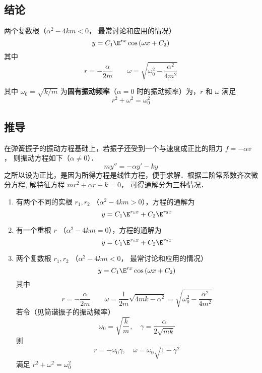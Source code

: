 \subsection{结论}
两个复数根（${\alpha ^2} - 4km < 0$， 最常讨论和应用的情况）
\begin{equation}
y = {C_1}{\E^{rx}}\cos \left( {\omega x + {C_2}} \right)
\end{equation}
其中
\begin{equation}
r =  - \frac{\alpha }{{2m}} \qquad  \omega  = \sqrt {\omega _0^2 - \frac{{{\alpha ^2}}}{{4{m^2}}}}
\end{equation}

其中 ${\omega _0} = \sqrt {{k}/{m}}$ 为\textbf{固有振动频率}（$\alpha  = 0$ 时的振动频率）为，$r$ 和 $\omega$ 满足
\begin{equation}
{r^2} + {\omega ^2} = \omega _0^2
\end{equation}

\subsection{推导}
在弹簧振子的振动方程基础上，若振子还受到一个与速度成正比的阻力 $f =  - \alpha v$， 则振动方程如下（$\alpha \ne 0$）．
\begin{equation}
my'' =  - \alpha y' - ky
\end{equation}
之所以设为正比，是因为所得方程是线性方程，便于求解．根据二阶常系数齐次微分方程,
解特征方程 $m{r^2} + \alpha r + k = 0$， 可得通解分为三种情况．
\begin{enumerate}
\item 有两个不同的实根 $r_1,r_2$ （${\alpha ^2} - 4km > 0$），方程的通解为
\begin{equation}
y = {C_1}{\E^{{r_1}x}} + {C_2}{\E^{{r_2}x}}
\end{equation}
\item 有一个重根 $r$ （${\alpha ^2} - 4km = 0$），方程的通解为
\begin{equation}
y = {C_1}{\E^{{r_1}x}} + {C_2}{\E^{{r_2}x}}
\end{equation}
\item 两个复数根 $r_1,r_2$ （${\alpha ^2} - 4km < 0$， 最常讨论和应用的情况）
\begin{equation}
y = {C_1}{\E^{rx}}\cos \left( {\omega x + {C_2}} \right)
\end{equation}
其中
\begin{equation}
r =  - \frac{\alpha }{2m}
\qquad
\omega = \frac{1}{2m}\sqrt {4mk - {\alpha ^2}}  = \sqrt {\omega _0^2 - \frac{{{\alpha ^2}}}{{4{m^2}}}}
\end{equation}  
若令（见简谐振子的振动频率）
\begin{equation}
{\omega _0} = \sqrt {\frac{k}{m}},\quad {\gamma  = \frac{\alpha }{2\sqrt{mk}}}
\end{equation}
则 
\begin{equation}
r =  - {\omega _0}\gamma,\quad \omega  = {\omega _0}\sqrt {1 - {\gamma ^2}}
\end{equation}
满足
${r^2} + {\omega ^2} = \omega _0^2$
\end{enumerate}

